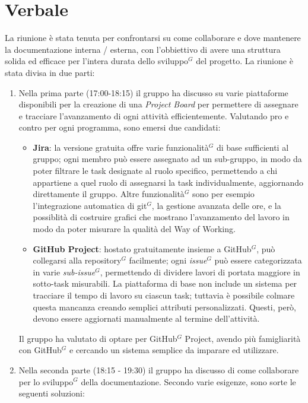 \documentclass[a4paper,10pt]{article}
\begin{document}
\section*{Verbale}
La riunione è stata tenuta per confrontarsi su come collaborare e dove mantenere la documentazione interna / esterna, con l'obbiettivo di avere una struttura solida ed efficace per l'intera durata dello sviluppo$^G$ del progetto.
La riunione è stata divisa in due parti:
\begin{enumerate}
    \item Nella prima parte (17:00-18:15) il gruppo ha discusso su varie piattaforme disponibili per la creazione di una \emph{Project Board} per permettere di assegnare e tracciare l'avanzamento di ogni attività efficientemente. Valutando pro e contro per ogni programma, sono emersi due candidati:
    \begin{itemize}
        \item \textbf{Jira}: la versione gratuita offre varie funzionalità$^G$ di base sufficienti al gruppo; ogni membro può essere assegnato ad un sub-gruppo, in modo da poter filtrare le task designate al ruolo specifico, permettendo a chi appartiene a quel ruolo di assegnarsi la task individualmente, aggiornando direttamente il gruppo. Altre funzionalità$^G$ sono per esempio l'integrazione automatica di git$^G$, la gestione avanzata delle ore, e la possiblità di costruire grafici che mostrano l'avanzamento del lavoro in modo da poter misurare la qualità del Way of Working. \\
        \item \textbf{GitHub Project}: hostato gratuitamente insieme a GitHub$^G$, può collegarsi alla repository$^G$ facilmente; ogni \emph{issue$^G$} può essere categorizzata in varie \emph{sub-issue$^G$}, permettendo di dividere lavori di portata maggiore in sotto-task misurabili. La piattaforma di base non include un sistema per tracciare il tempo di lavoro su ciascun task; tuttavia è possibile colmare questa mancanza creando semplici attributi personalizzati. Questi, però, devono essere aggiornati manualmente al termine dell’attività.
    \end{itemize}
    Il gruppo ha valutato di optare per GitHub$^G$ Project, avendo più famigliarità con GitHub$^G$ e cercando un sistema semplice da imparare ed utilizzare. \\
    \par
    \item Nella seconda parte (18:15 - 19:30) il gruppo ha discusso di come collaborare per lo sviluppo$^G$ della documentazione. Secondo varie esigenze, sono sorte le seguenti soluzioni:

\end{enumerate}
\end{document}
